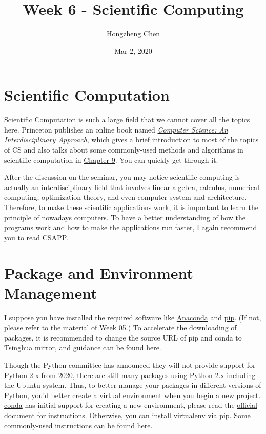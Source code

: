 \documentclass[english]{../TexTemplate/thesis}
\title{Week 6 - Scientific Computing}
\author{Hongzheng Chen}
\date{Mar 2, 2020}
\begin{document}
\maketitle

\section{Scientific Computation}
Scientific Computation is such a large field that we cannot cover all the topics here.
Princeton publishes an online book named \href{https://introcs.cs.princeton.edu/java/home/}{\emph{Computer Science: An Interdisciplinary Approach}}, which gives a brief introduction to most of the topics of CS and also talks about some commonly-used methods and algorithms in scientific computation in \href{https://introcs.cs.princeton.edu/java/90scientific/}{Chapter 9}. You can quickly get through it.

After the discussion on the seminar, you may notice scientific computing is actually an interdisciplinary field that involves linear algebra, calculus, numerical computing, optimization theory, and even computer system and architecture. Therefore, to make these scientific applications work, it is important to learn the principle of nowadays computers.
To have a better understanding of how the programs work and how to make the applications run faster, I again recommend you to read \href{https://csapp.cs.cmu.edu/}{CSAPP}.

\section{Package and Environment Management}
I suppose you have installed the required software like \href{https://www.anaconda.com/}{Anaconda} and \href{https://pypi.org/project/pip/}{pip}. (If not, please refer to the material of Week 05.) To accelerate the downloading of packages, it is recommended to change the source URL of pip and conda to \href{https://mirror.tuna.tsinghua.edu.cn/help/anaconda/}{Tsinghua mirror}, and guidance can be found \href{https://blog.csdn.net/weixin_41765699/article/details/83420149}{here}.

Though the Python committee has announced they will not provide support for Python 2.x from 2020, there are still many packages using Python 2.x including the Ubuntu system. Thus, to better manage your packages in different versions of Python, you'd better create a virtual environment when you begin a new project.
\href{https://conda.io/en/latest/}{conda} has initial support for creating a new environment, please read the \href{https://docs.conda.io/projects/conda/en/latest/user-guide/tasks/manage-environments.html}{official document} for instructions.
Otherwise, you can install \href{https://virtualenv.pypa.io/en/latest/}{virtualenv} via \href{https://pypi.org/project/pip/}{pip}. Some commonly-used instructions can be found \href{https://tecadmin.net/use-virtualenv-with-python3/}{here}.
\end{document}
